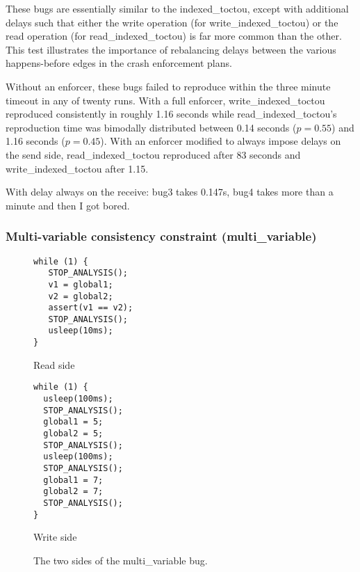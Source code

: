These bugs are essentially similar to the indexed\_toctou, except with
additional delays such that either the write operation (for
write\_indexed\_toctou) or the read operation (for
read\_indexed\_toctou) is far more common than the other.  This test
illustrates the importance of rebalancing delays between the various
happens-before edges in the crash enforcement plans.

Without an enforcer, these bugs failed to reproduce within the three
minute timeout in any of twenty runs.  With a full enforcer,
write\_indexed\_toctou reproduced consistently in roughly 1.16 seconds
while read\_indexed\_toctou's reproduction time was bimodally
distributed between 0.14 seconds ($p = 0.55$) and 1.16 seconds ($p =
0.45$).  With an enforcer modified to always impose delays on the send
side, read\_indexed\_toctou reproduced after 83 seconds and
write\_indexed\_toctou after 1.15.

With delay always on the receive: bug3 takes 0.147s, bug4 takes more
than a minute and then I got bored.



\subsubsection{Multi-variable consistency constraint (multi\_variable)}


\begin{figure}
  \begin{minipage}{70mm}
\begin{verbatim}
while (1) {
   STOP_ANALYSIS();
   v1 = global1;
   v2 = global2;
   assert(v1 == v2);
   STOP_ANALYSIS();
   usleep(10ms);
}
\end{verbatim}  
    \caption{Read side}
  \end{minipage}
  \begin{minipage}{70mm}
\begin{verbatim}
while (1) {
  usleep(100ms);
  STOP_ANALYSIS();
  global1 = 5;
  global2 = 5;
  STOP_ANALYSIS();
  usleep(100ms);
  STOP_ANALYSIS();
  global1 = 7;
  global2 = 7;
  STOP_ANALYSIS();
}
\end{verbatim}
    \caption{Write side}
  \end{minipage}
  \caption{The two sides of the multi\_variable bug.}
  \label{fig:eval:multi_variable}
\end{figure}

